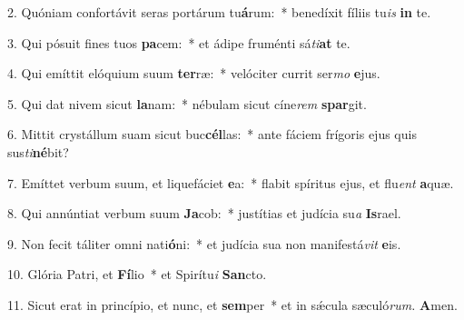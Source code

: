 \item 2. Quóniam confortávit seras portárum tu\textbf{á}rum:~* benedíxit fíliis tu\hspace{0.03em}\textit{is} \textbf{in} te.
\item 3. Qui pósuit fines tuos \textbf{pa}cem:~* et ádipe fruménti sá\hspace{0.03em}\textit{ti}\textbf{at} te.
\item 4. Qui emíttit elóquium suum \textbf{ter}ræ:~* velóciter currit ser\textit{mo} \textbf{e}jus.
\item 5. Qui dat nivem sicut \textbf{la}nam:~* nébulam sicut cíne\hspace{0.03em}\textit{rem} \textbf{spar}git.
\item 6. Mittit crystállum suam sicut buc\textbf{cél}las:~* ante fáciem frígoris ejus quis sus\-\hspace{0.03em}\textit{ti}\textbf{né}bit?
\item 7. Emíttet verbum suum, et liquefáciet \textbf{e}a:~* flabit spíritus ejus, et flu\hspace{0.03em}\textit{ent} \textbf{a}quæ.
\item 8. Qui annúntiat verbum suum \textbf{Ja}cob:~* justítias et judícia su\hspace{0.03em}\textit{a} \textbf{Is}rael.
\item 9. Non fecit táliter omni nati\textbf{ó}ni:~* et judícia sua non manife\-stá\hspace{0.03em}\textit{vit} \textbf{e}is.
\item 10. Glória Patri, et \textbf{Fí}lio~* et Spirítu\hspace{0.03em}\textit{i} \textbf{San}cto.
\item 11. Sicut erat in princípio, et nunc, et \textbf{sem}per~* et in sǽcula sæculó\textit{rum.} \textbf{A}men.
